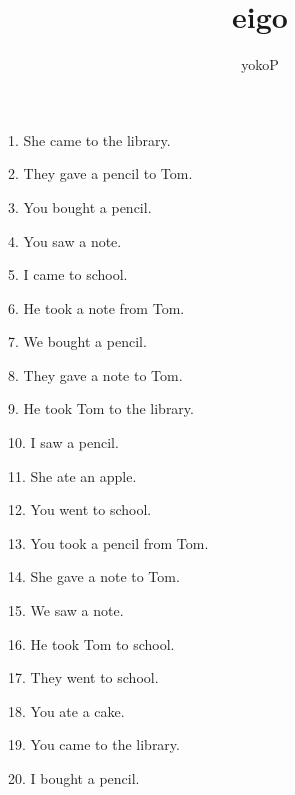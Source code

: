 \documentclass[uplatex,
paper=a4,
fontsize=18pt,
jafontsize=16pt,
number_of_lines=30,
line_length=30zh,
baselineskip=25pt,
]{jlreq}
\author{yokoP}
\title{eigo}
\begin{document}
1.  She came to the library.

2.  They gave a pencil to Tom.

3.  You bought a pencil.

4.  You saw a note.

5.  I came to school.

6.  He took a note from Tom.

7.  We bought a pencil.

8.  They gave a note to Tom.

9.  He took Tom to the library.

10.  I saw a pencil.

11.  She ate an apple.

12.  You went to school.

13.  You took a pencil from Tom.

14.  She gave a note to Tom.

15.  We saw a note.

16.  He took Tom to school.

17.  They went to school.

18.  You ate a cake.

19.  You came to the library.

20.  I bought a pencil.
\end{document}
